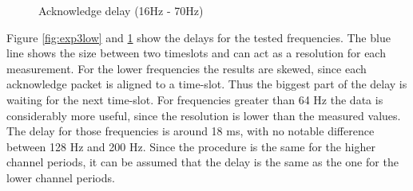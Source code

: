 \begin{description}
\begin{figure}[H]
		\caption{Acknowledge delay (16Hz - 70Hz)}\label{fig:exp3high}
	\end{figure}
	Figure \ref{fig:exp3low} and \ref{fig:exp3high} show the delays for the tested frequencies. The blue line shows the size between two timeslots and can act as a resolution for each measurement. For the lower frequencies the results are skewed, since each acknowledge packet is aligned to a time-slot. Thus the biggest part of the delay is waiting for the next time-slot. For frequencies greater than 64 Hz the data is considerably more useful, since the resolution is lower than the measured values. The delay for those frequencies is around 18 ms, with no notable difference between 128 Hz and 200 Hz. Since the procedure is the same for the higher channel periods, it can be assumed that the delay is the same as the one for the lower channel periods.
\end{description}
\newpage


